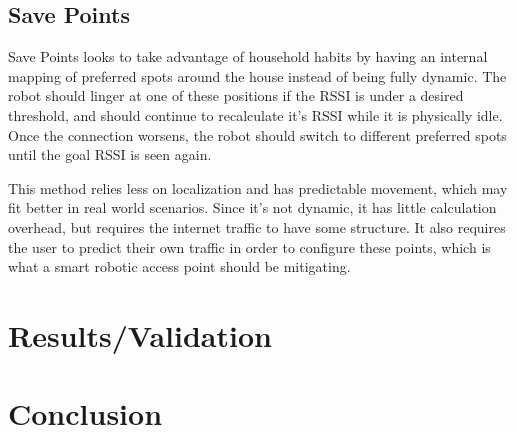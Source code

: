 \subsection{Save Points}
Save Points looks to take advantage of household habits by having an internal mapping of preferred spots around the house instead of being fully dynamic. The robot should linger at one of these positions if the RSSI is under a desired threshold, and should continue to recalculate it’s RSSI while it is physically idle. Once the connection worsens, the robot should switch to different preferred spots until the goal RSSI is seen again.\par
This method relies less on localization and has predictable movement, which may fit better in real world scenarios. Since it’s not dynamic, it has little calculation overhead, but requires the internet traffic to have some structure. It also requires the user to predict their own traffic in order to configure these points, which is what a smart robotic access point should be mitigating.


\section{Results/Validation}
\Blindtext

\section{Conclusion}
\blindtext

